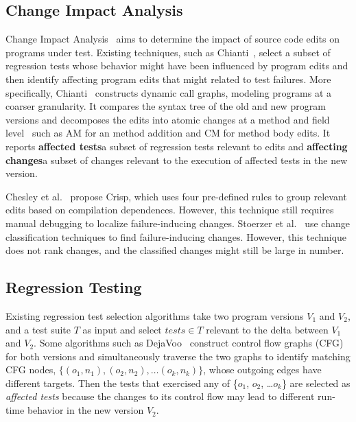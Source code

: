 \documentclass[runningheads,a4paper]{llncs}
\begin{document}
\subsection{Change Impact Analysis} 
Change Impact Analysis~\cite{Arnold1996:impact,Law:2003,Orso:2003,Orso2004:impact, ryder2001change,Ren2004, ren2006identifying} aims to determine the impact of source code edits on programs under test. Existing techniques, such as Chianti~\cite{ryder2001change,Ren2004, ren2006identifying}, select a subset of regression tests whose behavior might have been influenced by program edits and then identify affecting program edits that might related to test failures.  More specifically, Chianti~\cite{Ren2004} constructs dynamic call graphs, modeling programs at a coarser granularity. It compares the syntax tree of the old and new program versions and decomposes the edits into atomic changes at a method and field level~\cite{Ren2004} such as \textsf{AM} for an method addition and \textsf{CM} for method body edits. It reports {\bf affected tests}\textemdash a subset of regression tests relevant to edits and {\bf affecting changes}\textemdash a subset of changes relevant to the execution of affected tests in the new version. 

Chesley et al.~\cite{Chesley2005} propose Crisp, which uses four pre-defined rules to group relevant edits based on compilation dependences. However, this technique still requires manual debugging to localize failure-inducing changes. Stoerzer et al.~\cite{Stoerzer2006} use change classification techniques to find failure-inducing changes. However, this technique does not rank changes, and the classified changes might still be large in number. 

\subsection{Regression Testing} 
Existing regression test selection algorithms take two program versions $V_1$ and $V_2$, and a test suite $T$ as input and select $tests \in T$ relevant to the delta between $V_1$ and $V_2$. Some algorithms such as DejaVoo~\cite{Rothermel1997, Harrold2001, Orso2004} construct control flow graphs (CFG) for both versions and simultaneously traverse the two graphs to identify matching CFG nodes, $\{(o_1, n_1), (o_2, n_2), \ldots (o_k, n_k)\}$, whose outgoing edges have different targets. Then the tests that exercised any of \{$o_1$, $o_2$, \ldots $o_k$\} are selected as {\em affected tests} because the changes to its control flow may lead to different run-time behavior in the new version $V_2$. 
\end{document}
